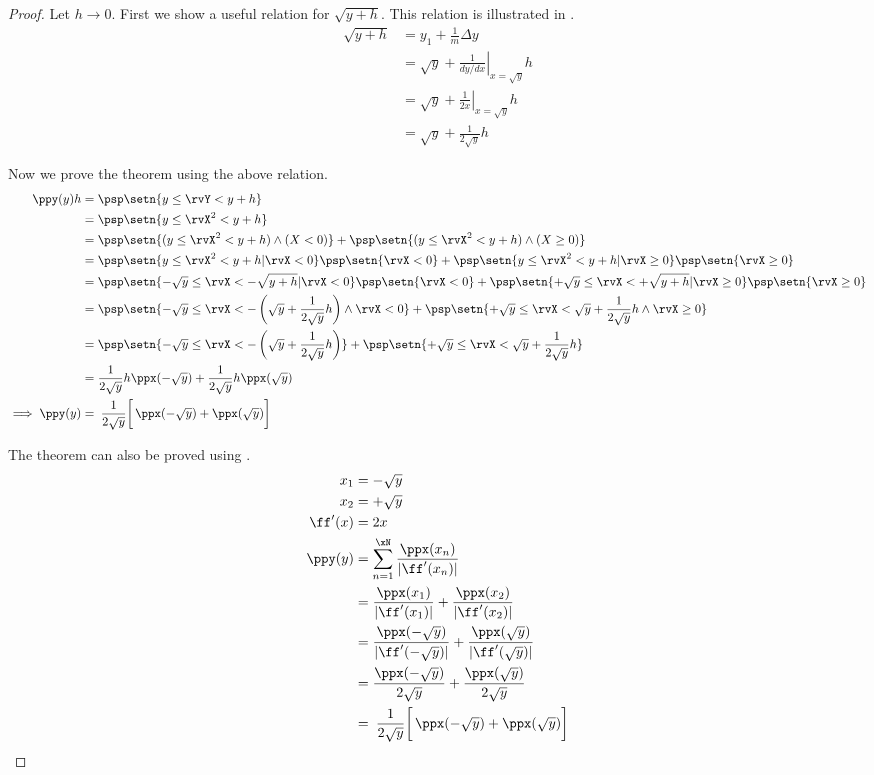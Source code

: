 \begin{proof}
Let $h\to0$.
First we show a useful relation for $\sqrt{y+h}$.
This relation is illustrated in .
\begin{align*}
  \sqrt{y+h}
    &=    y_1 + \frac{1}{m} \Delta y
  \\&=    \sqrt{y} + \left.\frac{1}{dy/dx}\right|_{x=\sqrt{y}} h
  \\&=    \sqrt{y} + \left.\frac{1}{2x}\right|_{x=\sqrt{y}} h
  \\&=    \sqrt{y} + \frac{1}{2\sqrt{y}} h
\end{align*}

Now we prove the theorem using the above relation.
\begin{align*}
  \ppy(y)h
    &= \psp\setn{y\le\rvY < y+h}
  \\&= \psp\setn{y\le\rvX^2 < y+h}
  \\&= \psp\setn{(y\le\rvX^2 < y+h) \land (X<0)}+ \psp\setn{(y\le\rvX^2 < y+h) \land (X\ge0)}
  \\&= \psp\setn{y\le\rvX^2 < y+h |\rvX<0}\psp\setn{\rvX<0} + \psp\setn{y\le\rvX^2 < y+h |\rvX\ge0}\psp\setn{\rvX\ge0}
  \\&= \psp\setn{-\sqrt{y}\le\rvX < -\sqrt{y+h} |\rvX<0  } \psp\setn{\rvX<0} +
       \psp\setn{+\sqrt{y}\le\rvX < +\sqrt{y+h} |\rvX\ge0} \psp\setn{\rvX\ge0}
  \\&= \psp\setn{-\sqrt{y}\le\rvX < -\left(\sqrt{y}+\frac{1}{2\sqrt{y}}h\right) \land\rvX<0   } +
       \psp\setn{+\sqrt{y}\le\rvX <        \sqrt{y}+\frac{1}{2\sqrt{y}}h        \land\rvX\ge0 }
  \\&= \psp\setn{-\sqrt{y}\le\rvX < -\left(\sqrt{y}+\frac{1}{2\sqrt{y}}h\right)  } +
       \psp\setn{+\sqrt{y}\le\rvX <        \sqrt{y}+\frac{1}{2\sqrt{y}}h         }
  \\&= \frac{1}{2\sqrt{y}}h\ppx(-\sqrt{y})  +
       \frac{1}{2\sqrt{y}}h\ppx( \sqrt{y})
\\\implies
  \ppy(y)
    &=  \left.\left.\frac{1}{2\sqrt{y}}\right[
        \ppx(-\sqrt{y}) + \ppx( \sqrt{y}) \right]
\end{align*}

The theorem can also be proved using .
\begin{align*}
  x_1 &= -\sqrt{y} \\
  x_2 &= +\sqrt{y} \\
  \ff'(x) &= 2x    \\
  \ppy(y)
    &= \sum_{n=1}^{\xN} \frac{\ppx(x_n)}{|\ff'(x_n)|}
  \\&= \frac{\ppx(x_1)}{|\ff'(x_1)|} + \frac{\ppx(x_2)}{|\ff'(x_2)|}
  \\&= \frac{\ppx(-\sqrt{y})}{|\ff'(-\sqrt{y})|} + \frac{\ppx(\sqrt{y})}{|\ff'(\sqrt{y})|}
  \\&= \frac{\ppx(-\sqrt{y})}{2\sqrt{y}} + \frac{\ppx(\sqrt{y})}{2\sqrt{y}}
  \\&=    \left.\left.\frac{1}{2\sqrt{y}}\right[
          \ppx(-\sqrt{y}) + \ppx( \sqrt{y}) \right]
\end{align*}
\end{proof}




